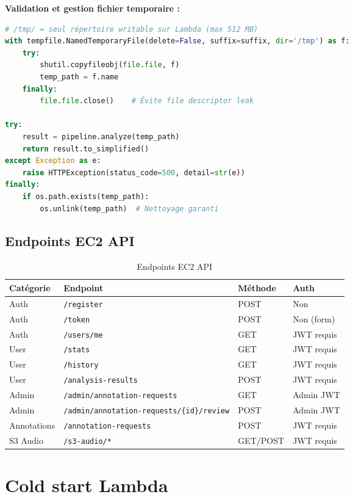 \documentclass[11pt,a4paper]{article}
\newcommand{\code}[1]{\texttt{\small #1}}
\begin{document}
\textbf{Validation et gestion fichier temporaire :}
\begin{lstlisting}[language=Python,caption={Gestion fichier temporaire Lambda}]
# /tmp/ = seul répertoire writable sur Lambda (max 512 MB)
with tempfile.NamedTemporaryFile(delete=False, suffix=suffix, dir='/tmp') as f:
    try:
        shutil.copyfileobj(file.file, f)
        temp_path = f.name
    finally:
        file.file.close()    # Évite file descriptor leak

try:
    result = pipeline.analyze(temp_path)
    return result.to_simplified()
except Exception as e:
    raise HTTPException(status_code=500, detail=str(e))
finally:
    if os.path.exists(temp_path):
        os.unlink(temp_path)  # Nettoyage garanti
\end{lstlisting}

\subsection{Endpoints EC2 API}

\begin{table}[htbp]
\centering
\begin{tabular}{@{}lllp{4cm}@{}}
\toprule
\textbf{Catégorie} & \textbf{Endpoint} & \textbf{Méthode} & \textbf{Auth} \\
\midrule
Auth & \code{/register} & POST & Non \\
Auth & \code{/token} & POST & Non (form) \\
Auth & \code{/users/me} & GET & JWT requis \\
User & \code{/stats} & GET & JWT requis \\
User & \code{/history} & GET & JWT requis \\
User & \code{/analysis-results} & POST & JWT requis \\
Admin & \code{/admin/annotation-requests} & GET & Admin JWT \\
Admin & \code{/admin/annotation-requests/\{id\}/review} & POST & Admin JWT \\
Annotations & \code{/annotation-requests} & POST & JWT requis \\
S3 Audio & \code{/s3-audio/*} & GET/POST & JWT requis \\
\bottomrule
\end{tabular}
\caption{Endpoints EC2 API}
\end{table}

\section{Cold start Lambda}
\end{document}
